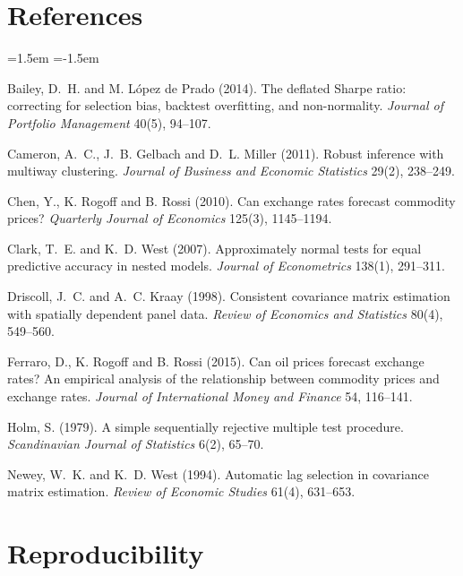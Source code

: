 \documentclass[11pt,a4paper]{article}
\begin{document}
\section*{References}
\begin{list}{}{\leftmargin=1.5em \itemindent=-1.5em \itemsep3pt}

\item Bailey, D.~H. and M. L\'opez de Prado (2014). The deflated Sharpe ratio:
correcting for selection bias, backtest overfitting, and non-normality.
\emph{Journal of Portfolio Management} 40(5), 94--107.

\item Cameron, A.~C., J.~B. Gelbach and D.~L. Miller (2011). Robust inference
with multiway clustering. \emph{Journal of Business and Economic Statistics}
29(2), 238--249.

\item Chen, Y., K. Rogoff and B. Rossi (2010). Can exchange rates forecast
commodity prices? \emph{Quarterly Journal of Economics} 125(3), 1145--1194.

\item Clark, T.~E. and K.~D. West (2007). Approximately normal tests for equal
predictive accuracy in nested models. \emph{Journal of Econometrics} 138(1),
291--311.

\item Driscoll, J.~C. and A.~C. Kraay (1998). Consistent covariance matrix
estimation with spatially dependent panel data. \emph{Review of Economics and
Statistics} 80(4), 549--560.

\item Ferraro, D., K. Rogoff and B. Rossi (2015). Can oil prices forecast
exchange rates? An empirical analysis of the relationship between commodity
prices and exchange rates. \emph{Journal of International Money and Finance}
54, 116--141.

\item Holm, S. (1979). A simple sequentially rejective multiple test procedure.
\emph{Scandinavian Journal of Statistics} 6(2), 65--70.

\item Newey, W.~K. and K.~D. West (1994). Automatic lag selection in covariance
matrix estimation. \emph{Review of Economic Studies} 61(4), 631--653.

\end{list}

\section*{Reproducibility}
\end{document}

